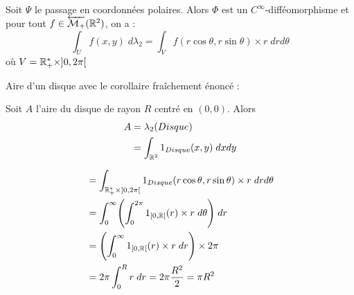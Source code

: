 \begin{corollary}
    Soit $\Psi$ le passage en coordonnées polaires. Alors $\Phi$ est un $C^\infty$-difféomorphisme et 
    pour tout $f \in \overleftarrow{\mathcal{M}_+}(\mathbb{R}^2)$, on a :
        \[  \int_U f(x,y) \;d \lambda_2 = \int_V f(r \cos \theta, r \sin \theta) \times r \; dr d \theta \]
    où $V = \mathbb{R}_+^* \times ]0,2\pi[$
\end{corollary}

\begin{example}

    Aire d'un disque avec le corollaire fraîchement énoncé :

    \begin{minipage}{0.45\textwidth}
        Soit $A$ l'aire du disque de rayon $R$ centré en $(0,0)$.
        Alors
            \begin{align*}
                A &= \lambda_2(Disque) \\
                &= \int_{\mathbb{R}^2} 1_{Disque}(x,y) \; dxdy
            \end{align*}
    \end{minipage}
    \hfill 
    \begin{minipage}{0.45\textwidth}
        \begin{center}
        \end{center}
    \end{minipage}
    \begin{align*}
        &= \int_{\mathbb{R}_+^* \times ]0,2\pi[} 1_{Disque}(r \cos \theta, r \sin \theta) \times r \; dr d \theta \\
        &= \int_{0}^{\infty} \Biggl( \int_{0}^{2\pi} 1_{[0,\mathbb{R}[}(r) \times r \; d \theta \Biggr) \; dr \\
        &= \Biggl( \int_{0}^{\infty} 1_{[0,\mathbb{R}[}(r) \times r \; d r \Biggr) \times 2 \pi \\
        &= 2 \pi \int_{0}^{R} r \; dr = 2 \pi \frac{R^2}{2} = \pi R^2 
    \end{align*}
\end{example}

